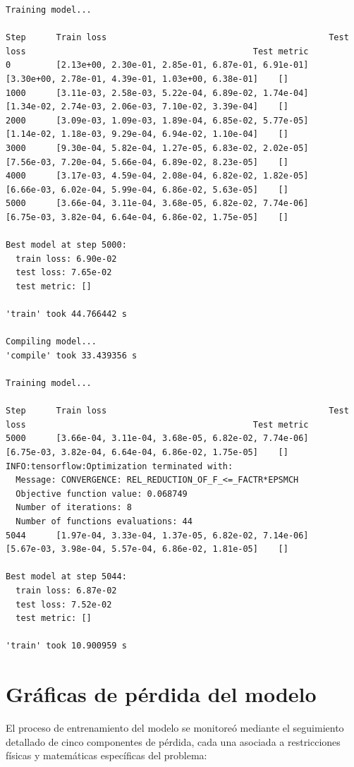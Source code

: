 \documentclass[
  spanish,
  us-letterpaper,
  DIV=11,
  numbers=noendperiod]{scrreprt}
\theoremstyle{plain}
\theoremstyle{definition}
\theoremstyle{remark}
\begin{document}
\begin{verbatim}
Training model...

Step      Train loss                                            Test loss                                             Test metric
0         [2.13e+00, 2.30e-01, 2.85e-01, 6.87e-01, 6.91e-01]    [3.30e+00, 2.78e-01, 4.39e-01, 1.03e+00, 6.38e-01]    []  
1000      [3.11e-03, 2.58e-03, 5.22e-04, 6.89e-02, 1.74e-04]    [1.34e-02, 2.74e-03, 2.06e-03, 7.10e-02, 3.39e-04]    []  
2000      [3.09e-03, 1.09e-03, 1.89e-04, 6.85e-02, 5.77e-05]    [1.14e-02, 1.18e-03, 9.29e-04, 6.94e-02, 1.10e-04]    []  
3000      [9.30e-04, 5.82e-04, 1.27e-05, 6.83e-02, 2.02e-05]    [7.56e-03, 7.20e-04, 5.66e-04, 6.89e-02, 8.23e-05]    []  
4000      [3.17e-03, 4.59e-04, 2.08e-04, 6.82e-02, 1.82e-05]    [6.66e-03, 6.02e-04, 5.99e-04, 6.86e-02, 5.63e-05]    []  
5000      [3.66e-04, 3.11e-04, 3.68e-05, 6.82e-02, 7.74e-06]    [6.75e-03, 3.82e-04, 6.64e-04, 6.86e-02, 1.75e-05]    []  

Best model at step 5000:
  train loss: 6.90e-02
  test loss: 7.65e-02
  test metric: []

'train' took 44.766442 s

Compiling model...
'compile' took 33.439356 s

Training model...

Step      Train loss                                            Test loss                                             Test metric
5000      [3.66e-04, 3.11e-04, 3.68e-05, 6.82e-02, 7.74e-06]    [6.75e-03, 3.82e-04, 6.64e-04, 6.86e-02, 1.75e-05]    []  
INFO:tensorflow:Optimization terminated with:
  Message: CONVERGENCE: REL_REDUCTION_OF_F_<=_FACTR*EPSMCH
  Objective function value: 0.068749
  Number of iterations: 8
  Number of functions evaluations: 44
5044      [1.97e-04, 3.33e-04, 1.37e-05, 6.82e-02, 7.14e-06]    [5.67e-03, 3.98e-04, 5.57e-04, 6.86e-02, 1.81e-05]    []  

Best model at step 5044:
  train loss: 6.87e-02
  test loss: 7.52e-02
  test metric: []

'train' took 10.900959 s
\end{verbatim}

\section{Gráficas de pérdida del
modelo}\label{gruxe1ficas-de-puxe9rdida-del-modelo}

El proceso de entrenamiento del modelo se monitoreó mediante el
seguimiento detallado de cinco componentes de pérdida, cada una asociada
a restricciones físicas y matemáticas específicas del problema:
\end{document}
